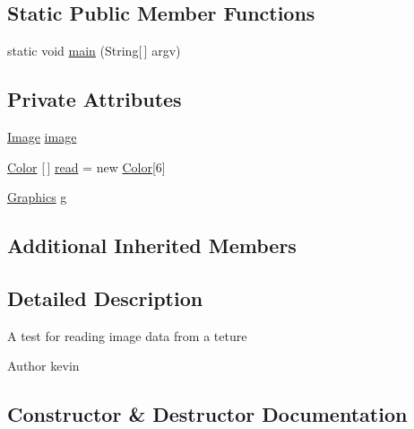 \subsection*{Static Public Member Functions}
\begin{DoxyCompactItemize}
\item 
static void \mbox{\hyperlink{classorg_1_1newdawn_1_1slick_1_1tests_1_1_image_read_test_a3e81be95ccba77e0ec981aae2225fa5b}{main}} (String\mbox{[}$\,$\mbox{]} argv)
\end{DoxyCompactItemize}
\subsection*{Private Attributes}
\begin{DoxyCompactItemize}
\item 
\mbox{\hyperlink{classorg_1_1newdawn_1_1slick_1_1_image}{Image}} \mbox{\hyperlink{classorg_1_1newdawn_1_1slick_1_1tests_1_1_image_read_test_ae9727db5ef94831ba4684e9cc8faa5c3}{image}}
\item 
\mbox{\hyperlink{classorg_1_1newdawn_1_1slick_1_1_color}{Color}} \mbox{[}$\,$\mbox{]} \mbox{\hyperlink{classorg_1_1newdawn_1_1slick_1_1tests_1_1_image_read_test_ab0721babf247ba03bc83a35f2a3091bd}{read}} = new \mbox{\hyperlink{classorg_1_1newdawn_1_1slick_1_1_color}{Color}}\mbox{[}6\mbox{]}
\item 
\mbox{\hyperlink{classorg_1_1newdawn_1_1slick_1_1_graphics}{Graphics}} \mbox{\hyperlink{classorg_1_1newdawn_1_1slick_1_1tests_1_1_image_read_test_a13250d14a7e738e60c94a62d6b55c566}{g}}
\end{DoxyCompactItemize}
\subsection*{Additional Inherited Members}


\subsection{Detailed Description}
A test for reading image data from a teture

\begin{DoxyAuthor}{Author}
kevin 
\end{DoxyAuthor}


\subsection{Constructor \& Destructor Documentation}
\mbox{\label{classorg_1_1newdawn_1_1slick_1_1tests_1_1_image_read_test_ac33f59aec733dc068e8838a4da22bcf9}} 

